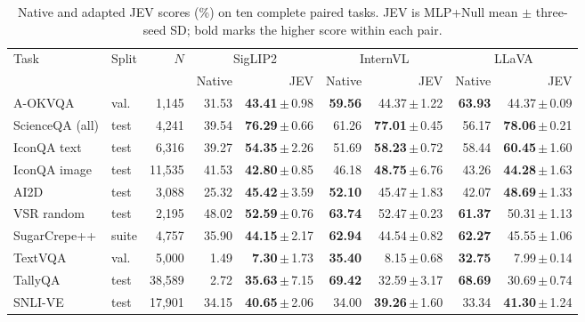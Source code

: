 \begin{table}[t]
\centering\small
\setlength{\tabcolsep}{3pt}\renewcommand{\arraystretch}{1.10}
\caption{Native and adapted JEV scores (\%) on ten complete paired tasks. JEV is MLP+Null mean $\pm$ three-seed SD; bold marks the higher score within each pair.}
\label{tab:native-main}
\begin{tabular}{@{}llrrr@{\hspace{6pt}}rr@{\hspace{6pt}}rr@{}}
\toprule
Task & Split & $N$ & \multicolumn{2}{c}{SigLIP2} & \multicolumn{2}{c}{InternVL} & \multicolumn{2}{c}{LLaVA} \\
\cmidrule(lr){4-5}\cmidrule(lr){6-7}\cmidrule(l){8-9}
 & & & Native & JEV & Native & JEV & Native & JEV \\
\midrule
A-OKVQA & val. & 1,145 & 31.53 & \textbf{43.41}\,$\pm$\,0.98 & \textbf{59.56} & 44.37\,$\pm$\,1.22 & \textbf{63.93} & 44.37\,$\pm$\,0.09 \\
ScienceQA (all) & test & 4,241 & 39.54 & \textbf{76.29}\,$\pm$\,0.66 & 61.26 & \textbf{77.01}\,$\pm$\,0.45 & 56.17 & \textbf{78.06}\,$\pm$\,0.21 \\
IconQA text & test & 6,316 & 39.27 & \textbf{54.35}\,$\pm$\,2.26 & 51.69 & \textbf{58.23}\,$\pm$\,0.72 & 58.44 & \textbf{60.45}\,$\pm$\,1.60 \\
IconQA image & test & 11,535 & 41.53 & \textbf{42.80}\,$\pm$\,0.85 & 46.18 & \textbf{48.75}\,$\pm$\,6.76 & 43.26 & \textbf{44.28}\,$\pm$\,1.63 \\
AI2D & test & 3,088 & 25.32 & \textbf{45.42}\,$\pm$\,3.59 & \textbf{52.10} & 45.47\,$\pm$\,1.83 & 42.07 & \textbf{48.69}\,$\pm$\,1.33 \\
VSR random & test & 2,195 & 48.02 & \textbf{52.59}\,$\pm$\,0.76 & \textbf{63.74} & 52.47\,$\pm$\,0.23 & \textbf{61.37} & 50.31\,$\pm$\,1.13 \\
SugarCrepe++ & suite & 4,757 & 35.90 & \textbf{44.15}\,$\pm$\,2.17 & \textbf{62.94} & 44.54\,$\pm$\,0.82 & \textbf{62.27} & 45.55\,$\pm$\,1.06 \\
TextVQA & val. & 5,000 & 1.49 & \textbf{7.30}\,$\pm$\,1.73 & \textbf{35.40} & 8.15\,$\pm$\,0.68 & \textbf{32.75} & 7.99\,$\pm$\,0.14 \\
TallyQA & test & 38,589 & 2.72 & \textbf{35.63}\,$\pm$\,7.15 & \textbf{69.42} & 32.59\,$\pm$\,3.17 & \textbf{68.69} & 30.69\,$\pm$\,0.74 \\
SNLI-VE & test & 17,901 & 34.15 & \textbf{40.65}\,$\pm$\,2.06 & 34.00 & \textbf{39.26}\,$\pm$\,1.60 & 33.34 & \textbf{41.30}\,$\pm$\,1.24 \\
\bottomrule
\end{tabular}
\end{table}
